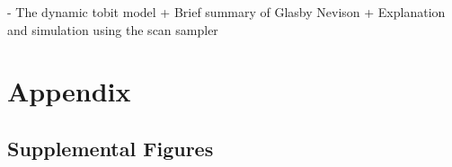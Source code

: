 \documentclass{article}
\begin{document}
- The dynamic tobit model
  + Brief summary of Glasby Nevison
  + Explanation and simulation using the scan sampler




\section{Appendix}
\label{sec:appendix}

\subsection{Supplemental Figures}
\label{subsec:supplemental_figures}

\begin{figure}[ht]
  \centering
  \caption{\label{fig:rpart_simple} }
\end{figure}

\begin{figure}[ht]
  \centering
  \caption{\label{fig:label} }
\end{figure}

\begin{figure}[ht]
  \centering
  \caption{\label{fig:rpart_complex_3} }
\end{figure}

\begin{figure}[ht]
  \centering
  \caption{\label{fig:rpart_binary_simple} }
\end{figure}

\begin{figure}[ht]
  \centering
  \caption{\label{fig:rpart_conditional} }
\end{figure}
\end{document}
